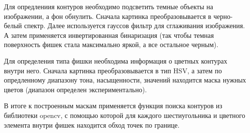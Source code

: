 \documentclass[10pt]{article}
\begin{document}
	Для опредлениия контуров необходимо подсветить темные объекты на изображении, а фон обнулить. Сначала картинка преобразовывается в черно-белый спектр. Далее используется гауссов фильтр для сглаживания изображения. А затем применяется инвертированная бинаризация (так чтобы темная поверхность фишек стала максимально яркой, а все остальное черным).
	
	Для определения типа фишки необходима информация о цветных контурах внутри него. Сначала картинка преобразовывается в тип HSV, а затем по опредленному диапазону тона, насыщенности, значений находится маска нужных цветов (диапазон определен экспериментально).
	
	В итоге к построенным маскам применяется функция поиска контуров из библиотеки opencv, с помощью которой для каждого шестиугольника и цветного элемента внутри фишек находится обход точек по границе.
	
\end{document}
